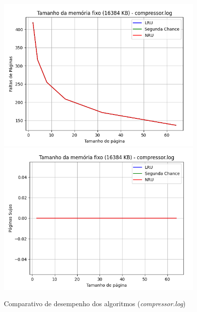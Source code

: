 \documentclass[a4paper, 12pt]{article}
\begin{document}
\begin{figure}[H]
    \centering
    \includegraphics[width=0.92\textwidth]{fixed_mem/compressor/fault.png}
    \hspace{1.5cm}
    \includegraphics[width=0.92\textwidth]{fixed_mem/compressor/write.png}
    \caption{Comparativo de desempenho dos algoritmos (\emph{compressor.log})}
    \label{fig:exampleFig3}
\end{figure}
\end{document}
